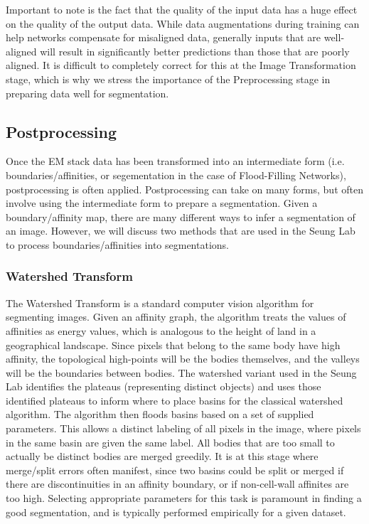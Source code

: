 Important to note is the fact that the quality of the input data has a huge effect on the quality of the output data. While data augmentations during training can help networks compensate for misaligned data, generally inputs that are well-aligned will result in significantly better predictions than those that are poorly aligned. It is difficult to completely correct for this at the Image Transformation stage, which is why we stress the importance of the Preprocessing stage in preparing data well for segmentation.

\subsection{Postprocessing}
Once the EM stack data has been transformed into an intermediate form (i.e. boundaries/affinities, or segementation in the case of Flood-Filling Networks), postprocessing is often applied. Postprocessing can take on many forms, but often involve using the intermediate form to prepare a segmentation. Given a boundary/affinity map, there are many different ways to infer a segmentation of an image. However, we will discuss two methods that are used in the Seung Lab to process boundaries/affinities into segmentations.

\subsubsection{Watershed Transform}
The Watershed Transform is a standard computer vision algorithm for segmenting images. Given an affinity graph, the algorithm treats the values of affinities as energy values, which is analogous to the height of land in a geographical landscape. Since pixels that belong to the same body have high affinity, the topological high-points will be the bodies themselves, and the valleys will be the boundaries between bodies. The watershed variant used in the Seung Lab identifies the plateaus (representing distinct objects) and uses those identified plateaus to inform where to place basins for the classical watershed algorithm. The algorithm then floods basins based on a set of supplied parameters. This allows a distinct labeling of all pixels in the image, where pixels in the same basin are given the same label. All bodies that are too small to actually be distinct bodies are merged greedily. It is at this stage where merge/split errors often manifest, since two basins could be split or merged if there are discontinuities in an affinity boundary, or if non-cell-wall affinites are too high. Selecting appropriate parameters for this task is paramount in finding a good segmentation, and is typically performed empirically for a given dataset.

